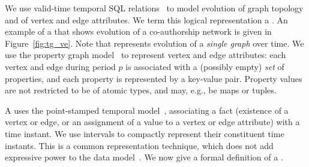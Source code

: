 

%

We use valid-time temporal SQL
relations~\cite{DBLP:conf/vldb/BohlenSS96} to model evolution of graph
topology and of vertex and edge attributes.  We term this logical
representation a \tg.  An example of a \tg that shows evolution of a
co-authorship network is given in Figure~\ref{fig:tg_ve}.  Note that
\tg represents evolution of a {\em single graph} over time.
%
We use the property graph model~\cite{GraphDB} to represent vertex and
edge attributes: each vertex and edge during period $p$ is associated
with a (possibly empty) {\em set} of properties, and each property is
represented by a key-value pair.  Property values are not restricted
to be of atomic types, and may, e.g., be maps or tuples.

A \tg uses the point-stamped temporal
model~\cite{DBLP:reference/db/Toman09}, associating a fact (existence
of a vertex or edge, or an assignment of a value to a vertex or edge
attribute) with a time instant.  We use intervals to compactly
represent their constituent time instants.  This is a common
representation technique, which does not add expressive power to the
data model~\cite{DBLP:conf/ictl/Chomicki94}.  We now give a formal
definition of a \tg.

